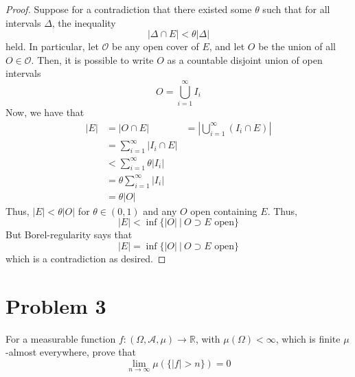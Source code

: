 \documentclass[fontsize=11pt]{scrartcl} %
\numberwithin{equation}{section} %
\numberwithin{figure}{section} %
\numberwithin{table}{section} %
\newcommand{\R}{\mathbb{R}}
\newcommand{\A}{\mathscr{A}}
\begin{document}
\begin{proof}
Suppose for a contradiction that there existed some $\theta$ such that for all intervals
$\Delta$, the inequality
\[
|\Delta\cap E| < \theta |\Delta|
\]
held. In particular, let $\mathscr{O}$ be any open cover of $E$, and let $O$ be the union
of all $O\in\mathscr{O}$. Then, it is possible to write $O$ as a countable disjoint union of
open intervals
\[
O = \bigcup_{i=1}^{\infty} I_i
\]
Now, we have that
\[
\begin{aligned}
|E|         &= |O\cap E|
            &= |\bigcup_{i=1}^{\infty} (I_i\cap E)|\\
            &= \sum_{i=1}^{\infty} |I_i\cap E|\\
            &< \sum_{i=1}^{\infty} \theta|I_i|\\
            &= \theta\sum_{i=1}^{\infty}|I_i|\\
            &= \theta|O|
\end{aligned}
\]
Thus, $|E| < \theta|O|$ for $\theta\in(0,1)$ and any $O$ open containing $E$. Thus,
\[
|E| < \inf\{|O|\ |\ O\supset E \textrm{ open}\}
\]
But Borel-regularity says that
\[
|E| = \inf\{|O|\ |\ O\supset E \textrm{ open}\}
\]
which is a contradiction as desired.
\end{proof}
\section*{Problem 3}
For a measurable function $f:(\Omega,\A,\mu)\to\R$, with $\mu(\Omega)<\infty$, which
is finite $\mu$-almost everywhere, prove that
\[
\lim_{n\to\infty} \mu(\{|f|> n\}) = 0
\]
\end{document}
